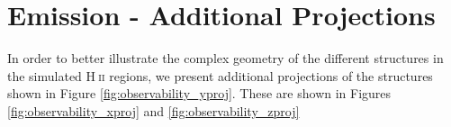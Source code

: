 \documentclass[a4paper,fleqn,usenatbib]{mnras}
\newcommand{\HII}{H$~$\textsc{ii}\xspace}
\begin{document}




\appendix
%
%
\section{Emission - Additional Projections}
\label{appendix:emission_additional_projections}

In order to better illustrate the complex geometry of the different structures in the simulated \HII regions, we present additional projections of the structures shown in Figure \ref{fig:observability_yproj}. These are shown in Figures \ref{fig:observability_xproj} and \ref{fig:observability_zproj}
\end{document}
